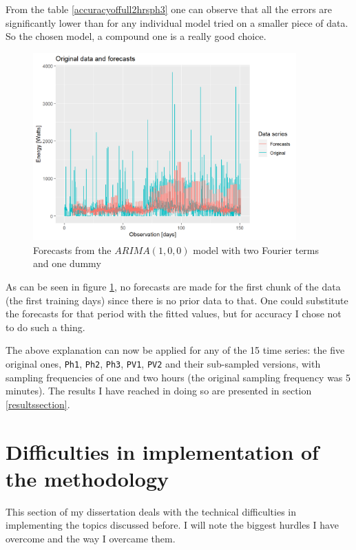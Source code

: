 \documentclass[12pt,a4paper,titlepage]{report}
\begin{document}
From the table \ref{accuracyoffull2hrsph3} one can observe that all the errors are significantly lower than for any individual model tried on a smaller piece of data. So the chosen model, a compound one is a really good choice.
    
\begin{figure}[h]
    \centering
    \includegraphics[width=0.9\textwidth]{d2hrsph3fourierDummiesforecast}
    \caption{Forecasts from the $ ARIMA(1, 0, 0) $ model with two Fourier terms and one dummy}
    \label{d2hrsph3fourierDummiesforecast}
\end{figure}

As can be seen in figure \ref{d2hrsph3fourierDummiesforecast}, no forecasts are made for the first chunk of the data (the first training days) since there is no prior data to that. One could substitute the forecasts for that period with the fitted values, but for accuracy I chose not to do such a thing.

The above explanation can now be applied for any of the 15 time series: the five original ones, \texttt{Ph1}, \texttt{Ph2}, \texttt{Ph3}, \texttt{PV1}, \texttt{PV2} and their sub-sampled versions, with sampling frequencies of one and two hours (the original sampling frequency was 5 minutes). The results I have reached in doing so are presented in section \ref{resultssection}.

\section{Difficulties in implementation of the methodology}
This section of my dissertation deals with the technical difficulties in implementing the topics discussed before. I will note the biggest hurdles I have overcome and the way I overcame them.
\end{document}
